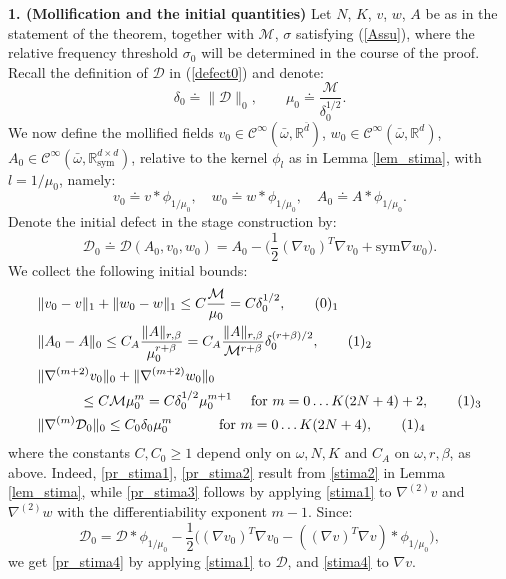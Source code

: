 \documentclass[reqno,twoside,11pt]{amsart}
\newcommand{\sym}{\mathrm{sym}}
\newcommand{\R}{\mathbb{R}}
\numberwithin{equation}{section}
\theoremstyle{plain}
\theoremstyle{definition}
\begin{document}
{\bf 1. (Mollification and the initial quantities)} 
Let $N$, $K$, $v$, $w$, $A$ be as
in the statement of the theorem, together with $\mathcal{M}$,
$\sigma$ satisfying (\ref{Assu}), where the relative frequency threshold $\sigma_0$ will
be determined in the course of the proof. Recall the definition of
$\mathcal{D}$ in (\ref{defect0}) and denote:
$$\delta_0 \doteq \|\mathcal{D}\|_0, \qquad \mu_0 \doteq \frac{\mathcal{M}}{\delta_0^{1/2}}.$$ 
We now define the mollified fields $v_0\in\mathcal{C}^\infty(\bar\omega, \R^{\bar d})$,
$w_0\in \mathcal{C}^\infty(\bar\omega, \R^{d})$,
$A_0\in\mathcal{C}^\infty(\bar\omega, \R^{d\times d}_\sym)$, relative
to the kernel $\phi_l$ as in Lemma \ref{lem_stima}, with $l=1/\mu_0$, namely:
$$v_0 \doteq v\ast \phi_{1/\mu_0},\quad w_0 \doteq w\ast
\phi_{1/\mu_0}, \quad A_0 \doteq A\ast \phi_{1/\mu_0}.$$
Denote the initial defect in the stage construction by:
$${\mathcal{D}}_0 \doteq \mathcal{D}(A_0, v_0, w_0) = A_0 -
\big(\frac{1}{2}(\nabla v_0)^T\nabla v_0 + \sym\nabla w_0\big).$$ 
We collect the following initial bounds:
\begin{align*}
& \|v_0-v\|_1 + \|w_0-w\|_1 \leq C \frac{\mathcal{M}}{\mu_0} = C\delta_0^{1/2},
\tag*{(\theequation)$_1$}\refstepcounter{equation} \label{pr_stima1}\\
& \|A_0-A\|_0 \leq C_A \frac{\|A\|_{r,\beta}}{\mu_0^{r+\beta}} = C_A
\frac{\|A\|_{r,\beta}}{\mathcal{M}^{r+\beta}} \delta_0^{(r+\beta)/2},
\tag*{(\theequation)$_2$} \label{pr_stima2}\\ 
& \|\nabla^{(m+2)}v_0\|_0 + \|\nabla^{(m+2)}w_0\|_0 \notag\\
&\qquad\quad \leq
C\mathcal{M}\mu_0^m = C\delta_0^{1/2} \mu_0^{m+1}
\quad \mbox{ for } m=0\ldots K(2N+4)+2,
\tag*{(\theequation)$_3$} \label{pr_stima3}\\ 
& \|\nabla^{(m)} \mathcal{D}_0\|_0\leq
C_0 \delta_0\mu_0^m \qquad \quad \mbox{ for }
m=0\ldots K(2N+4), \tag*{(\theequation)$_4$}\label{pr_stima4} 
\end{align*}
where the constants $C, C_0\geq 1$ depend only on $\omega, N, K$ and $C_A$
on $\omega, r,\beta$, as above. Indeed,  \ref{pr_stima1},
\ref{pr_stima2} result from \ref{stima2} in Lemma \ref{lem_stima}, 
while \ref{pr_stima3} follows by applying \ref{stima1} to 
$\nabla^{(2)}v$ and $\nabla^{(2)}w$ with the differentiability exponent $m-1$.
Since:
$$\mathcal{D}_0 = \mathcal{D}\ast \phi_{1/\mu_0} - \frac{1}{2}\big((\nabla
v_0)^T\nabla v_0 - ((\nabla v)^T\nabla v)\ast\phi_{1/\mu_0}\big), $$ 
we get \ref{pr_stima4} by applying \ref{stima1} to $\mathcal{D}$, and
\ref{stima4} to $\nabla v$.
\end{document}
